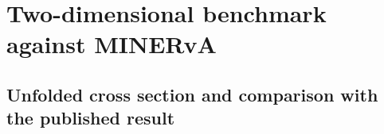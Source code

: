 \section{Two-dimensional benchmark against MINERvA}
\label{sec:part-2d}
\label{sec:results}

\subsection{Unfolded cross section and comparison with the published result}
\label{sec:muon-cross-section-comparison}
\label{sec:results-xsec}

